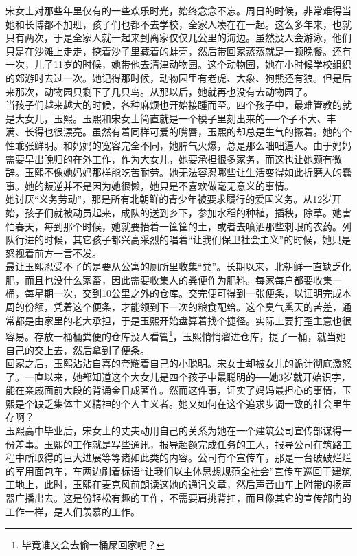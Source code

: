 宋女士对那些年里仅有的一些欢乐时光，始终念念不忘。周日的时候，非常难得当她和长博都不加班，孩子们也都不去学校，全家人凑在在一起。这么多年来，也就只有两次，于是全家人就一起来到离家仅仅几公里的海边。虽然没人会游泳，他们只是在沙滩上走走，挖着沙子里藏着的蚌壳，然后带回家蒸蒸就是一顿晚餐。还有一次，儿子11岁的时候，她带他去清津动物园。这个动物园，她在小时候学校组织的郊游时去过一次。她记得那时候，动物园里有老虎、大象、狗熊还有狼。但是后来那次，动物园只剩下了几只鸟。从那以后，她就再也没有去动物园了。\\

当孩子们越来越大的时候，各种麻烦也开始接踵而至。四个孩子中，最难管教的就是大女儿，玉熙。玉熙和宋女士简直就是一个模子里刻出来的──个子不大、丰满、长得也很漂亮。虽然有着同样可爱的嘴唇，玉熙的却总是生气的撅着。她的个性乖张鲜明。和妈妈的宽容完全不同，她脾气火爆，总是那么咄咄逼人。由于妈妈需要早出晚归的在外工作，作为大女儿，她要承担很多家务，而这也让她颇有微辞。玉熙不像她妈妈那样能吃苦耐劳。她无法容忍哪些让生活变得如此折磨人的蠢事。她的叛逆并不是因为她很懒，她只是不喜欢做毫无意义的事情。\\

她讨厌“义务劳动”，那是所有北朝鲜的青少年被要求履行的爱国义务。从12岁开始，孩子们就被动员起来，成队的送到乡下，参加水稻的种植，插秧，除草。她害怕春天，每到那个时候，她就要抬着一筐筐的土，或者去喷洒那些刺眼的农药。列队行进的时候，其它孩子都兴高采烈的唱着“让我们保卫社会主义”的时候，她只是怒视着前方一言不发。\\

最让玉熙忍受不了的是要从公寓的厕所里收集“粪”。长期以来，北朝鲜一直缺乏化肥，而且也没什么家畜，因此需要收集人的粪便作为肥料。每家每户都要收集一桶，每星期一次，交到10公里之外的仓库。交完便可得到一张便条，以证明完成本周的份额，凭着这个便条，才能领到下一次的粮食配给。这个臭气熏天的苦差，通常都是由家里的老大承担，于是玉熙开始盘算着找个捷径。实际上要打歪主意也很容易。存放一桶桶粪便的仓库没人看管\footnote{毕竟谁又会去偷一桶屎回家呢？}，玉熙悄悄溜进仓库，提了一桶，就当她自己的交上去，然后拿到了便条。\\

回家之后，玉熙沾沾自喜的夸耀着自己的小聪明。宋女士却被女儿的诡计彻底激怒了。一直以来，她都知道这个大女儿是四个孩子中最聪明的──她3岁就开始识字，能在亲戚面前大段的背诵金日成著作。然而这件事，证实了妈妈最担心的事情，玉熙是个缺乏集体主义精神的个人主义者。她又如何在这个追求步调一致的社会里生存啊？\\

玉熙高中毕业后，宋女士的丈夫动用自己的关系为她在一个建筑公司宣传部谋得一份差事。玉熙的工作就是写些通讯，报导超额完成任务的工人，报导公司在筑路工程中所取得的巨大进展等等诸如此类的内容。公司有个宣传车，那是一台破破烂烂的军用面包车，车两边刷着标语“让我们以主体思想规范全社会”宣传车巡回于建筑工地上，此时，玉熙在麦克风前朗读这她的通讯文章，然后声音由车上附带的扬声器广播出去。这是份轻松有趣的工作，不需要肩挑背扛，而且像其它的宣传部门的工作一样，是人们羡慕的工作。\\

